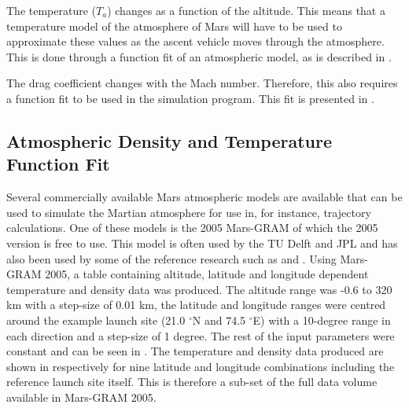






\noindent
The temperature ($T_{{a}}$) changes as a function of the altitude. This means that a temperature model of the atmosphere of Mars will have to be used to approximate these values as the ascent vehicle moves through the atmosphere. This is done through a function fit of an atmospheric model, as is described in .

The drag coefficient changes with the Mach number. Therefore, this also requires a function fit to be used in the simulation program. This fit is presented in .

\subsection{Atmospheric Density and Temperature Function Fit}
\label{subsec:atmofuncfit}
Several commercially available Mars atmospheric models are available that can be used to simulate the Martian atmosphere for use in, for instance, trajectory calculations. One of these models is the 2005 Mars-\acf{GRAM} \citep{justus1990mars} of which the 2005 version is free to use. This model is often used by the TU Delft and \ac{JPL} and has also been used by some of the reference research such as \cite{desai1998} and \cite{trinidad2012}.
Using Mars-\ac{GRAM} 2005, a table containing altitude, latitude and longitude dependent temperature and density data was produced. The altitude range was -0.6 to 320 km  with a step-size of 0.01 km, the latitude and longitude ranges were centred around the example launch site (21.0 $^\circ$N and 74.5 $^\circ$E) with a 10-degree range in each direction and a step-size of 1 degree. The rest of the input parameters were constant and can be seen in . The temperature and density data produced are shown in  respectively for nine latitude and longitude combinations including the reference launch site itself. This is therefore a sub-set of the full data volume available in Mars-\ac{GRAM} 2005. 

